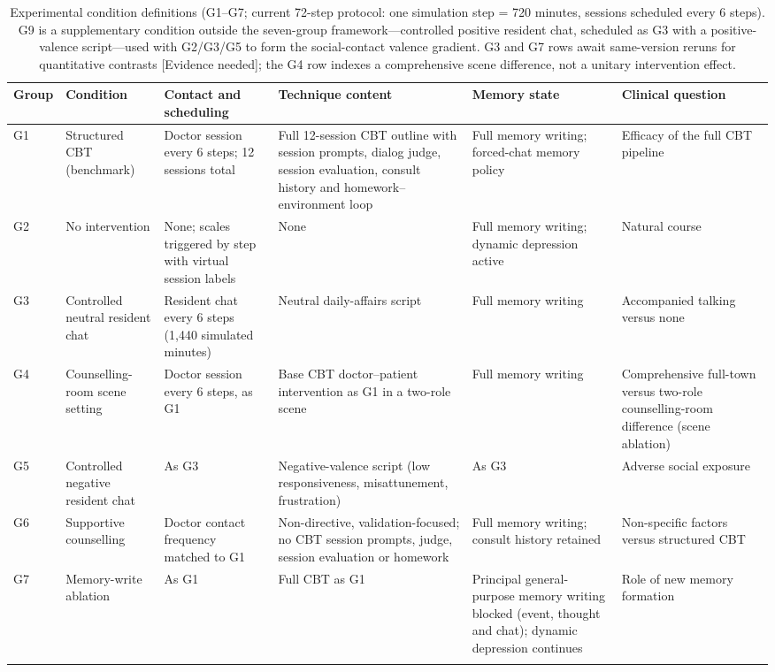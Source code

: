 \documentclass[sn-nature,pdflatex]{sn-jnl}
\begin{document}
\begin{table}[h]
\caption{Experimental condition definitions (G1--G7; current 72-step protocol: one simulation step = 720 minutes, sessions scheduled every 6 steps). G9 is a supplementary condition outside the seven-group framework---controlled positive resident chat, scheduled as G3 with a positive-valence script---used with G2/G3/G5 to form the social-contact valence gradient. G3 and G7 rows await same-version reruns for quantitative contrasts [Evidence needed]; the G4 row indexes a comprehensive scene difference, not a unitary intervention effect.}\label{tab:conditions}
\footnotesize
\setlength{\tabcolsep}{3pt}
\begin{tabular}{@{}p{0.9cm}p{1.8cm}p{2.0cm}p{2.8cm}p{2.3cm}p{2.0cm}@{}}
\toprule
Group & Condition & Contact and scheduling & Technique content & Memory state & Clinical question \\
\midrule
G1 & Structured CBT (benchmark) & Doctor session every 6 steps; 12 sessions total & Full 12-session CBT outline with session prompts, dialog judge, session evaluation, consult history and homework--environment loop & Full memory writing; forced-chat memory policy & Efficacy of the full CBT pipeline \\
G2 & No intervention & None; scales triggered by step with virtual session labels & None & Full memory writing; dynamic depression active & Natural course \\
G3 & Controlled neutral resident chat & Resident chat every 6 steps (1,440 simulated minutes) & Neutral daily-affairs script & Full memory writing & Accompanied talking versus none \\
G4 & Counselling-room scene setting & Doctor session every 6 steps, as G1 & Base CBT doctor--patient intervention as G1 in a two-role scene & Full memory writing & Comprehensive full-town versus two-role counselling-room difference (scene ablation) \\
G5 & Controlled negative resident chat & As G3 & Negative-valence script (low responsiveness, misattunement, frustration) & As G3 & Adverse social exposure \\
G6 & Supportive counselling & Doctor contact frequency matched to G1 & Non-directive, validation-focused; no CBT session prompts, judge, session evaluation or homework & Full memory writing; consult history retained & Non-specific factors versus structured CBT \\
G7 & Memory-write ablation & As G1 & Full CBT as G1 & Principal general-purpose memory writing blocked (event, thought and chat); dynamic depression continues & Role of new memory formation \\
\botrule
\end{tabular}
\end{table}
\end{document}
